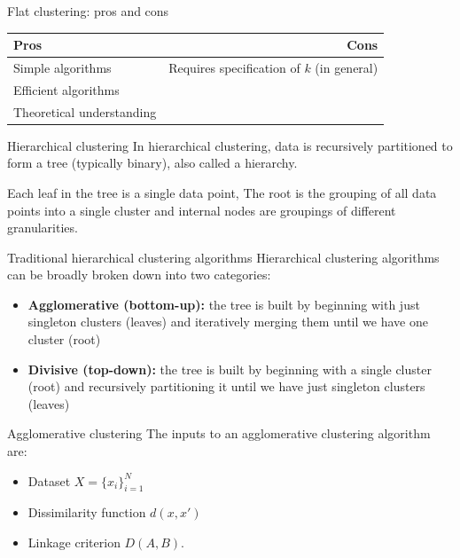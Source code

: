 \documentclass[10pt, compress]{beamer}
\begin{document}
\begin{frame}{Flat clustering: pros and cons}
  \begin{table}
    \begin{tabular}{lr}
      \toprule
      Pros & Cons \\
      \midrule
      Simple algorithms &  Requires specification of $k$ (in general)\\
      Efficient algorithms & \\
      Theoretical understanding & \\
      \bottomrule
    \end{tabular}
  \end{table}
\end{frame}

\begin{frame}{Hierarchical clustering}
  In \alert{hierarchical clustering}, data
  is recursively partitioned to form a tree (typically binary),
  also called a hierarchy.


  Each leaf in the tree is a single data point,
  The root is the grouping of all data points
  into a single cluster and internal nodes
  are groupings of different granularities.
\end{frame}

\begin{frame}{Traditional hierarchical clustering algorithms}
  Hierarchical clustering algorithms can be broadly broken
  down into two categories:

  \begin{itemize}
    \item<2-> \textbf{Agglomerative (bottom-up):} the tree is built by
      beginning with just singleton clusters (leaves) and
      iteratively merging them until we have one cluster (root)
    \item<3-> \textbf{Divisive (top-down):} the tree is built
      by beginning with a single cluster (root) and
      recursively partitioning it until we
      have just singleton clusters (leaves)
  \end{itemize}
\end{frame}

\begin{frame}{Agglomerative clustering}
  The inputs to an agglomerative clustering algorithm
  are:
  \begin{itemize}
    \item<2-> Dataset $X = \{x_i\}_{i = 1}^N$
    \item<3-> Dissimilarity function $d(x, x')$
    \item<4-> Linkage criterion $D(A, B)$.
  \end{itemize}

\end{frame}
\end{document}
